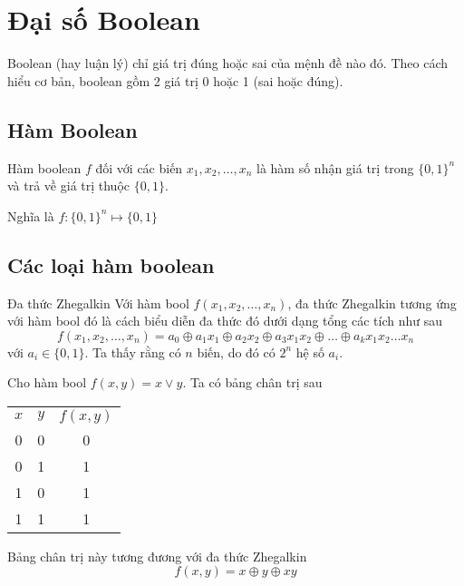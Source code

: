 \chapter{Đại số Boolean}

Boolean (hay luận lý) chỉ giá trị đúng hoặc sai của mệnh đề nào đó. 
Theo cách hiểu cơ bản, boolean gồm 2 giá trị 0 hoặc 1 (sai hoặc đúng).

\section{Hàm Boolean}

Hàm boolean $f$ đối với các biến $x_1, x_2, \ldots, x_n$ là hàm số nhận giá trị trong $\{0, 1\}^n$ và trả về giá trị thuộc $\{0, 1\}$.

Nghĩa là $f: \{0,1\}^n \mapsto \{0, 1\}$

\section{Các loại hàm boolean}

\begin{definition}{Đa thức Zhegalkin}
    Với hàm bool $f(x_1, x_2, \ldots, x_n)$, đa thức Zhegalkin tương ứng với hàm bool đó là cách biểu diễn
    đa thức đó dưới dạng tổng các tích như sau
    \[f(x_1, x_2, \ldots, x_n) = a_0 \oplus a_1 x_1 \oplus a_2 x_2 \oplus a_3 x_1 x_2 \oplus \ldots \oplus a_k x_1 x_2 \ldots x_n\]
    với $a_i \in \{0, 1\}$. Ta thấy rằng có $n$ biến, do đó có $2^n$ hệ số $a_i$.
\end{definition}

\begin{example}
    Cho hàm bool $f(x, y) = x \vee y$. Ta có bảng chân trị sau
    \begin{table}[ht]
        \centering
        \begin{tabular}{c c c}
            $x$ & $y$ & $f(x, y)$ \\
            0 & 0 & 0 \\
            0 & 1 & 1 \\
            1 & 0 & 1 \\
            1 & 1 & 1 \\
        \end{tabular}
    \end{table}
    Bảng chân trị này tương đương với đa thức Zhegalkin
    \[f(x, y) = x \oplus y \oplus xy\]
\end{example}
